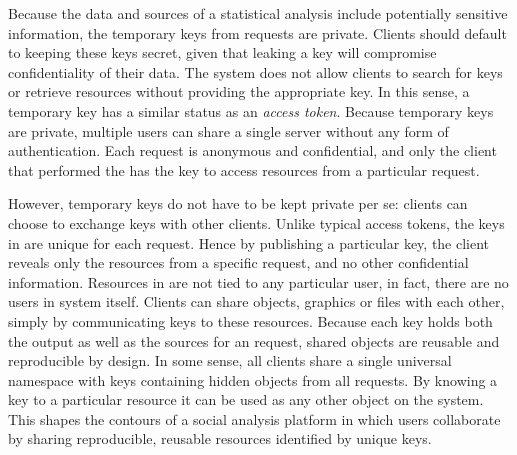 Because the data and sources of a statistical analysis include potentially sensitive information, the temporary keys from \RPC requests are private. Clients should default to keeping these keys secret, given that leaking a key will compromise confidentiality of their data. The system does not allow clients to search for keys or retrieve resources without providing the appropriate key. In this sense, a temporary key has a similar status as an \emph{access token}. Because temporary keys are private, multiple users can share a single \OpenCPU server without any form of authentication. Each request is anonymous and confidential, and only the client that performed the \RPC has the key to access resources from a particular request.

However, temporary keys do not have to be kept private per se: clients can choose to exchange keys with other clients. Unlike typical access tokens, the keys in \OpenCPU are unique for each request. Hence by publishing a particular key, the client reveals only the resources from a specific \RPC request, and no other confidential information. Resources in \OpenCPU are not tied to any particular user, in fact, there are no users in \OpenCPU system itself. Clients can share objects, graphics or files with each other, simply by communicating keys to these resources. Because each key holds both the output as well as the sources for an \RPC request, shared objects are reusable and reproducible by design. In some sense, all clients share a single universal namespace with keys containing hidden objects from all \RPC requests. By knowing a key to a particular resource it can be used as any other object on the system. This shapes the contours of a social analysis platform in which users collaborate by sharing reproducible, reusable resources identified by unique keys.


 